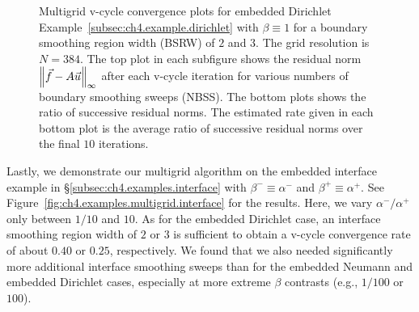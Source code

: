 \setlength{\figureheight}{0.37\columnwidth}
\begin{figure}[htbp]
\begin{center}
\caption{Multigrid v-cycle convergence plots for embedded Dirichlet Example~\ref{subsec:ch4.example.dirichlet} with $\beta \equiv 1$ for a boundary smoothing region width (BSRW) of $2$ and $3$. The grid resolution is $N = 384$. The top plot in each subfigure shows the residual norm $\left\lVert  \vec{f} - A\vec{u}  \right\rVert_{\infty}$ after each v-cycle iteration for various numbers of boundary smoothing sweeps (NBSS). The bottom plots shows the ratio of successive residual norms. The estimated rate given in each bottom plot is the average ratio of successive residual norms over the final $10$ iterations.}
\label{fig:ch4.examples.multigrid.dirichlet}
\end{center}
\end{figure}

Lastly, we demonstrate our multigrid algorithm on the embedded interface example in \S\ref{subsec:ch4.examples.interface} with $\beta^- \equiv \alpha^-$ and $\beta^+ \equiv \alpha^+$. See Figure~\ref{fig:ch4.examples.multigrid.interface} for the results. Here, we vary $\alpha^- / \alpha^+$ only between $1/10$ and $10$. As for the embedded Dirichlet case, an interface smoothing region width of $2$ or $3$ is sufficient to obtain a v-cycle convergence rate of about $0.40$ or $0.25$, respectively. We found that we also needed significantly more additional interface smoothing sweeps than for the embedded Neumann and embedded Dirichlet cases, especially at more extreme $\beta$ contrasts (e.g., $1/100$ or $100$).

